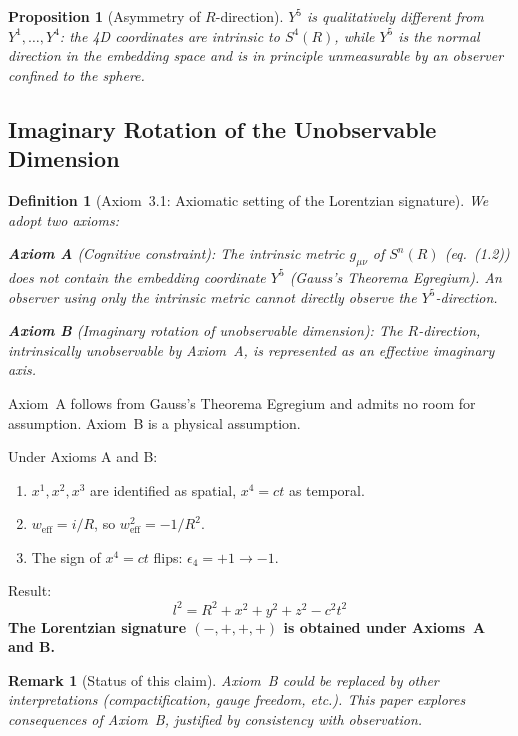 \documentclass[12pt,a4paper]{article}
\newtheorem{proposition}[theorem]{Proposition}
\newtheorem{definition}[theorem]{Definition}
\newtheorem*{remark}{Remark}
\begin{document}
\begin{proposition}[Asymmetry of $R$-direction]\label{prop:asym}
$Y^5$ is qualitatively different from $Y^1, \ldots, Y^4$: the 4D coordinates are intrinsic to $S^4(R)$, while $Y^5$ is the normal direction in the embedding space and is in principle unmeasurable by an observer confined to the sphere.
\end{proposition}

\subsection{Imaginary Rotation of the Unobservable Dimension}

\begin{definition}[Axiom~3.1: Axiomatic setting of the Lorentzian signature]\label{ax:lor}
We adopt two axioms:

\textbf{Axiom A} (Cognitive constraint): The intrinsic metric $g_{\mu\nu}$ of $S^n(R)$ (eq.~(1.2)) does not contain the embedding coordinate $Y^5$ (Gauss's Theorema Egregium). An observer using only the intrinsic metric cannot directly observe the $Y^5$-direction.

\textbf{Axiom B} (Imaginary rotation of unobservable dimension): The $R$-direction, intrinsically unobservable by Axiom~A, is represented as an effective imaginary axis.
\end{definition}

Axiom~A follows from Gauss's Theorema Egregium and admits no room for assumption. Axiom~B is a physical assumption.

Under Axioms A and B:

\begin{enumerate}
\item[(i)] $x^1, x^2, x^3$ are identified as spatial, $x^4 = ct$ as temporal.
\item[(ii)] $w_{\text{eff}} = i/R$, so $w_{\text{eff}}^2 = -1/R^2$.
\item[(iii)] The sign of $x^4 = ct$ flips: $\epsilon_4 = +1 \to -1$.
\end{enumerate}

Result:
\begin{equation}
l^2 = R^2 + x^2 + y^2 + z^2 - c^2t^2 \tag{3.3}
\end{equation}
\textbf{The Lorentzian signature $(-,+,+,+)$ is obtained under Axioms~A and B.}

\begin{remark}[Status of this claim]
Axiom~B could be replaced by other interpretations (compactification, gauge freedom, etc.). This paper explores consequences of Axiom~B, justified by consistency with observation.
\end{remark}
\end{document}
